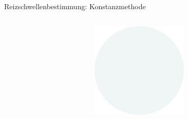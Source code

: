 \documentclass[aspectratio=169]{beamer}
\begin{document}
\begin{frame}{Reizschwellenbestimmung: Konstanzmethode}
\begin{columns}[c]
\begin{column}{1.5cm}
\end{column}
\begin{column}{1.5cm}
\includegraphics[width=\textwidth]{reizschwelle_seriell_3.png}
\end{column}

\end{columns}


    
\end{frame}
\end{document}
